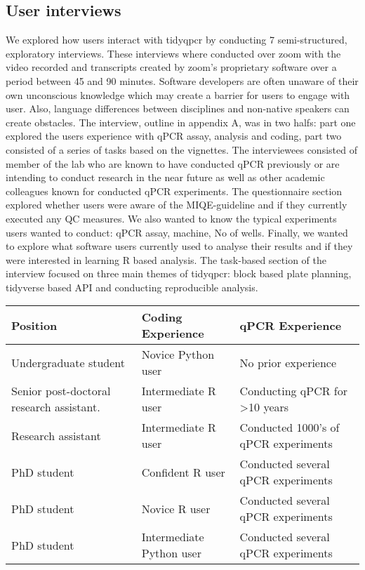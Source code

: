 \documentclass{SBCbookchapter}
\begin{document}
\subsection{User interviews}
We explored how users interact with tidyqpcr by conducting 7 semi-structured, exploratory interviews. These interviews where conducted over zoom with the video recorded and transcripts created by zoom's proprietary software over a period between 45 and 90 minutes. Software developers are often unaware of their own unconscious knowledge which may create a barrier for users to engage with user. Also, language differences between disciplines and non-native speakers can create obstacles.  The interview, outline in appendix A, was in two halfs: part one explored the users experience with qPCR assay, analysis and coding, part two consisted of a series of tasks based on the vignettes. The interviewees consisted of member of the lab who are known to have conducted qPCR previously or are intending to conduct research in the near future as well as other academic colleagues known for conducted qPCR experiments. The questionnaire section explored whether users were aware of the MIQE-guideline and if they currently executed any QC measures. We also wanted to know the typical experiments users wanted to conduct: qPCR assay, machine, No of wells. Finally, we wanted to explore what software users currently used to analyse their results and if they were interested in learning R based analysis. The task-based section of the interview focused on three main themes of tidyqpcr: block based plate planning, tidyverse based API and conducting reproducible analysis.

\begin{center}
\begin{tabular}{|| m{4cm} | m{4.4cm} | m{4.5cm} ||} 
 \hline
 \textbf{\large Position} & \textbf{\large Coding Experience} & \textbf{\large qPCR Experience} \\ [0.5ex] 
 \hline
 Undergraduate student & Novice Python user & No prior experience\\ 
 \hline
 Senior post-doctoral research assistant. & Intermediate R user & Conducting qPCR for >10 years \\
 \hline
 Research assistant & Intermediate R user & Conducted 1000's of qPCR experiments\\
 \hline
 PhD student & Confident R user & Conducted several qPCR experiments \\
 \hline
 PhD student & Novice R user & Conducted several qPCR experiments\\
 \hline
 PhD student & Intermediate Python user & Conducted several qPCR experiments\\
 \hline
\end{tabular}
\end{center}
\end{document}
